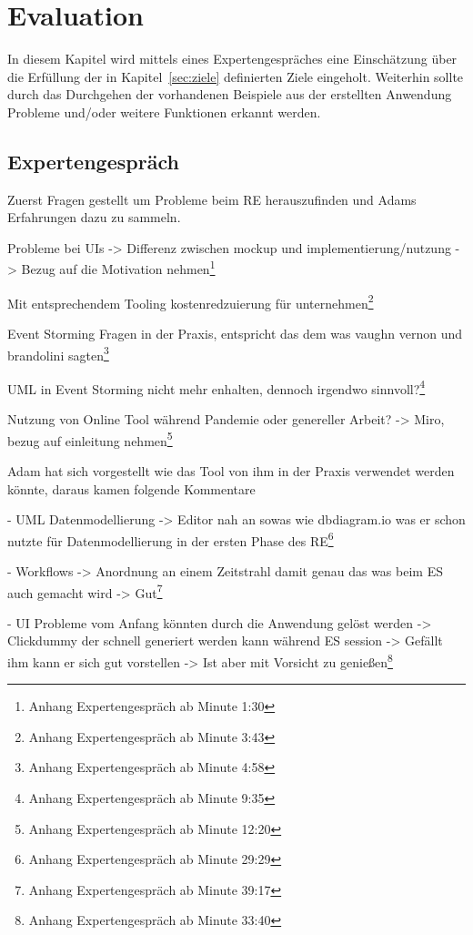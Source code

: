 \chapter{Evaluation}\label{ch:evaluation}
In diesem Kapitel wird mittels eines Expertengespräches eine Einschätzung über die Erfüllung der in
Kapitel~\ref{sec:ziele} definierten Ziele eingeholt.
Weiterhin sollte durch das Durchgehen der vorhandenen Beispiele aus der erstellten Anwendung Probleme und/oder weitere
Funktionen erkannt werden.

\section{Expertengespräch}\label{sec:expertengespraech}

Zuerst Fragen gestellt um Probleme beim RE herauszufinden und Adams Erfahrungen dazu zu sammeln.

Probleme bei UIs -> Differenz zwischen mockup und implementierung/nutzung -> Bezug auf die Motivation nehmen\footnote{Anhang Expertengespräch ab Minute 1:30}

Mit entsprechendem Tooling kostenredzuierung für unternehmen\footnote{Anhang Expertengespräch ab Minute 3:43}

Event Storming Fragen in der Praxis, entspricht das dem was vaughn vernon und brandolini sagten\footnote{Anhang Expertengespräch ab Minute 4:58}

UML in Event Storming nicht mehr enhalten, dennoch irgendwo sinnvoll?\footnote{Anhang Expertengespräch ab Minute 9:35}

Nutzung von Online Tool während Pandemie oder genereller Arbeit? -> Miro, bezug auf einleitung nehmen\footnote{Anhang Expertengespräch ab Minute 12:20}

Adam hat sich vorgestellt wie das Tool von ihm in der Praxis verwendet werden könnte, daraus kamen folgende Kommentare

- UML Datenmodellierung -> Editor nah an sowas wie dbdiagram.io was er schon nutzte für Datenmodellierung in der ersten Phase des RE\footnote{Anhang Expertengespräch ab Minute 29:29}

- Workflows -> Anordnung an einem Zeitstrahl damit genau das was beim ES auch gemacht wird -> Gut\footnote{Anhang Expertengespräch ab Minute 39:17}

- UI Probleme vom Anfang könnten durch die Anwendung gelöst werden -> Clickdummy
der schnell generiert werden kann während ES session ->
Gefällt ihm kann er sich gut vorstellen -> Ist aber mit Vorsicht zu genießen\footnote{Anhang Expertengespräch ab Minute 33:40}

